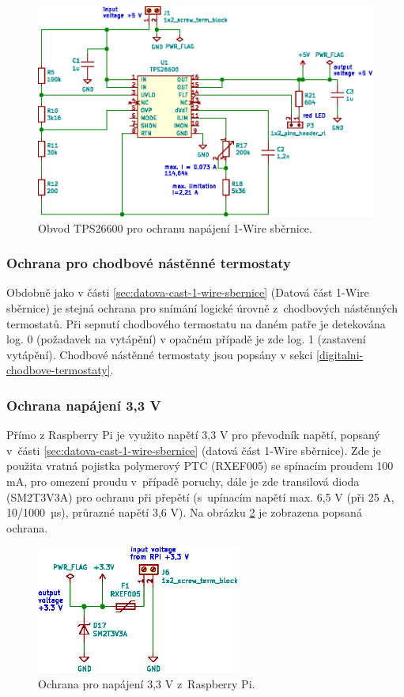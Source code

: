 \begin{figure}[H]
    \centering
    \includegraphics[width=\textwidth]{images/svg/kicad/ochrana-napajeni-1-wire.eps}
    \caption{Obvod TPS26600 pro ochranu napájení 1-Wire sběrnice.}
    \label{fig:ochrana-napajeni-1-wire}
\end{figure}

\subsubsection{Ochrana pro chodbové nástěnné termostaty}
Obdobně jako v části \ref{sec:datova-cast-1-wire-sbernice} (Datová část 1-Wire sběrnice) je stejná ochrana pro snímání logické úrovně z~chodbových nástěnných termostatů. Při sepnutí chodbového termostatu na daném patře je detekována log. 0 (požadavek na vytápění) v opačném případě je zde log. 1 (zastavení vytápění). Chodbové nástěnné termostaty jsou popsány v sekci \ref{digitalni-chodbove-termostaty}.

\subsubsection{Ochrana napájení 3,3 V}
Přímo z Raspberry Pi je využito napětí 3,3 V pro převodník napětí, popsaný v~části \ref{sec:datova-cast-1-wire-sbernice} (datová část 1-Wire sběrnice). Zde je použita vratná pojistka polymerový PTC (RXEF005) se spínacím proudem 100 mA, pro omezení proudu v~případě poruchy, dále je zde transilová dioda (SM2T3V3A) pro ochranu při přepětí (s~upínacím napětí max. 6,5 V (při 25 A, 10/1000~µs), průrazné napětí 3,6 V). Na obrázku \ref{fig:ochrana-napajeni-3_3-v} je zobrazena popsaná ochrana.

\begin{figure}[H]
    \centering
    \includegraphics[width=0.6\textwidth]{images/svg/kicad/ochrana-napajeni-3_3-v.eps}
    \caption{Ochrana pro napájení 3,3 V z~Raspberry Pi.}
    \label{fig:ochrana-napajeni-3_3-v}
\end{figure}

